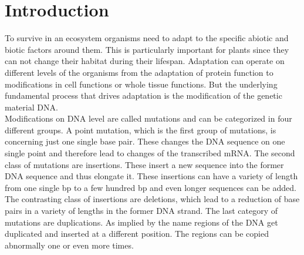 \chapter{Introduction}
To survive in an ecosystem organisms need to adapt to the specific abiotic and biotic factors around them. This is particularly important for plants since they can not change their habitat during their lifespan. Adaptation can operate on different levels of the organisms from the adaptation of protein function to modifications in cell functions or whole tissue functions. But the underlying fundamental process that drives adaptation is the modification of the genetic material DNA.\\
Modifications on DNA level are called mutations and can be categorized in four different groups. A point mutation, which is the first group of mutations, is concerning just one single base pair. These changes the DNA sequence on one single point and therefore lead to changes of the transcribed mRNA. The second class of mutations are insertions. These insert a new sequence into the former DNA sequence and thus elongate it. These insertions can have a variety of length from one single bp to a few hundred bp and even longer sequences can be added.  The contrasting class of insertions are deletions, which lead to a reduction of base pairs in a variety of lengths in the former DNA strand. The last category of mutations are duplications. As implied by the name regions of the DNA get duplicated and inserted at a different position. The regions can be copied abnormally one or even more times.\\

